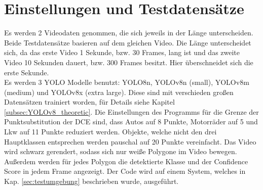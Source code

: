 \section{Einstellungen und Testdatensätze}
{%
	Es werden 2 Videodaten genommen, die sich jeweils in der Länge unterscheiden. Beide Testdatensätze basieren auf dem gleichen Video. Die Länge unterscheidet sich, da das erste Video 1 Sekunde, bzw. 30 Frames, lang ist und das zweite Video 10 Sekunden dauert, bzw. 300 Frames besitzt. Hier überschneidet sich die erste Sekunde. \\
	Es werden 3 YOLO Modelle benutzt: YOLO8n, YOLOv8n (small), YOLOv8m (medium) und YOLOv8x (extra large). Diese sind mit verschieden großen Datensätzen trainiert worden, für Details siehe Kapitel \ref{subsec:YOLOv8_theoretic}.
	Die Einstellungen des Programms für die Grenze der Punktsubstitution der DCE sind, dass Autos auf 8 Punkte, Motorräder auf 5 und Lkw auf 11 Punkte reduziert werden.
	Objekte, welche nicht den drei Hauptklassen entsprechen werden pauschal auf 20 Punkte vereinfacht. Das Video wird  schwarz gerendert, sodass sich nur weiße Polygone im Video bewegen. Außerdem werden für jedes Polygon die detektierte Klasse und der Confidence Score in jedem Frame angezeigt.
	Der Code wird auf einem System, welches in Kap. \ref{sec:testumgebung} beschrieben wurde, ausgeführt.

}
